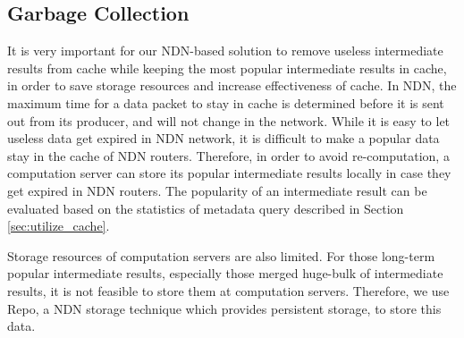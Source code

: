 \subsection{Garbage Collection} \label{sec:gg}
It is very important for our NDN-based solution to remove useless intermediate
results from cache while keeping the most popular intermediate results in cache,
in order to save storage resources and increase effectiveness of cache.  In NDN,
the maximum time for a {\sc data} packet to stay in cache is determined before
it is sent out from its producer, and will not change in the network.  While it
is easy to let useless {\sc data} get expired in NDN network, it is difficult to
make a popular {\sc data} stay in the cache of NDN routers.  Therefore, in order
to avoid re-computation, a computation server can store its popular intermediate
results locally in case they get expired in NDN routers.  The popularity of an
intermediate result can be evaluated based on the statistics of metadata query
described in Section \ref{sec:utilize_cache}.

Storage resources of computation servers are also limited. For those long-term
popular intermediate results, especially those merged huge-bulk of intermediate
results, it is not feasible to store them at computation servers.  Therefore, we
use Repo, a NDN storage technique which provides persistent storage, to store
this data.

